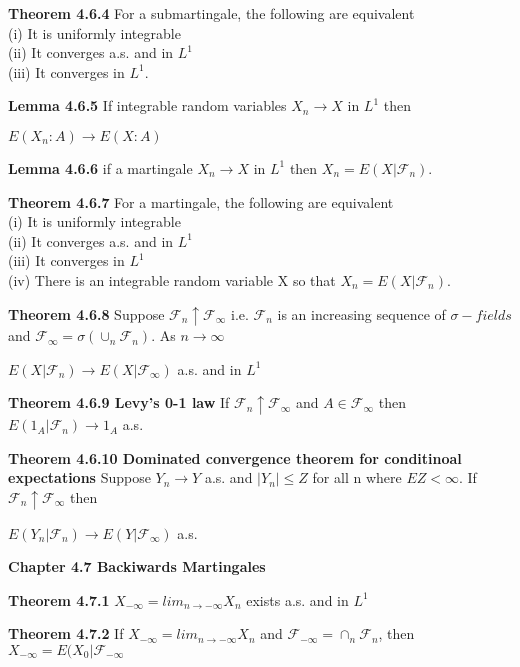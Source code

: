 \documentclass{article}
\newcommand\tab[1][1cm]{\hspace*{#1}}
\begin{document}
\textbf {Theorem 4.6.4} For a submartingale, the following are equivalent \\
(i) It is uniformly integrable \\
(ii) It converges a.s. and in $L^1$ \\
(iii) It converges in $L^1$.

\textbf {Lemma 4.6.5}  If integrable random variables $X_n \to X$ in $L^1$ then 
\begin{center}
$E(X_n : A) \to E(X:A)$
\end{center}

\textbf {Lemma 4.6.6} if a martingale $X_n \to X$ in $L^1$ then $X_n = E(X|\mathcal{F}_n)$.

\textbf {Theorem 4.6.7} For a martingale, the following are equivalent \\
(i) It is uniformly integrable \\
(ii) It converges a.s. and in $L^1$ \\
(iii) It converges in $L^1$ \\
(iv) There is an integrable random variable X so that $X_n = E(X| \mathcal{F}_n)$.

\textbf {Theorem 4.6.8} Suppose $\mathcal{F}_n \uparrow \mathcal{F}_\infty$ i.e. $\mathcal{F}_n$ is an increasing sequence of $\sigma-fields$ and $\mathcal{F}_\infty = \sigma(\cup_n \mathcal{F}_n)$. As $n \to \infty$
\begin{center}
$E(X|\mathcal{F}_n) \to E(X|\mathcal{F}_\infty)$ \tab a.s. and in $L^1$
\end{center}

\textbf {Theorem 4.6.9 Levy's 0-1 law} If $\mathcal{F}_n \uparrow \mathcal{F}_\infty$ and $A \in \mathcal{F}_\infty$ then $E(1_A|\mathcal{F}_n) \to 1_A$ a.s.

\textbf {Theorem 4.6.10 Dominated convergence theorem for conditinoal expectations} Suppose $Y_n \to Y$ a.s. and $|Y_n| \leq Z$ for all n where $EZ < \infty$. If $\mathcal{F}_n \uparrow \mathcal{F}_\infty$ then 
\begin{center}
$E(Y_n | \mathcal{F}_n) \to E(Y | \mathcal{F}_\infty)$ \tab a.s.
\end{center}

\textbf {Chapter 4.7 Backiwards Martingales}

\textbf {Theorem 4.7.1} $X_{-\infty} = lim_{n \to -\infty} X_n$ exists a.s. and in $L^1$

\textbf {Theorem 4.7.2} If $X_{-\infty} = lim_{n \to -\infty} X_n$ and $\mathcal{F}_{-\infty} = \cap_n \mathcal{F}_n$, then $X_{-\infty} = E(X_0|\mathcal{F}_{-\infty}$
\end{document}
